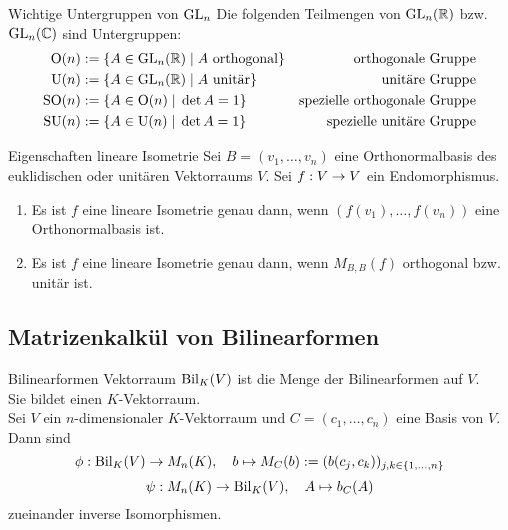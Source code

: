 \documentclass[main.tex]{subfiles}
\begin{document}
\begin{karte}{Wichtige Untergruppen von \(\operatorname{GL}_n\)}
    Die folgenden Teilmengen von \(\operatorname{GL}_n(\mathbb{R})\) bzw. \(\operatorname{GL}_n(\mathbb{C})\) sind Untergruppen:
    \begin{align*}
        \mathrm{O}(n) &:= \{A \in \operatorname{GL}_n(\mathbb{R}) \;\vert\; A \text{ orthogonal}\} &\text{orthogonale Gruppe}\\
        \mathrm{U}(n) &:= \{A \in \operatorname{GL}_n(\mathbb{R}) \;\vert\; A \text{ unitär}\} &\text{unitäre Gruppe}\\
        \mathrm{SO}(n) &:= \{A \in \mathrm{O}(n) \;\vert\; \det A = 1\} &\text{spezielle orthogonale Gruppe}\\
        \mathrm{SU}(n) &:= \{A \in \mathrm{U}(n) \;\vert\; \det A = 1\} &\text{spezielle unitäre Gruppe}
    \end{align*}
\end{karte}

\begin{karte}{Eigenschaften lineare Isometrie}
    Sei \(B = (v_1, \ldots, v_n)\) eine Orthonormalbasis des euklidischen oder unitären 
    Vektorraums \(V\). Sei \(f : V \rightarrow V\) ein Endomorphismus.
    \begin{enumerate}
        \item Es ist \(f\) eine lineare Isometrie genau dann, wenn \((f(v_1), \ldots, f(v_n))\)
        eine Orthonormalbasis ist.
        \item Es ist \(f\) eine lineare Isometrie genau dann, wenn \(M_{B,B}(f)\) orthogonal 
        bzw. unitär ist.
    \end{enumerate}
\end{karte}

\subsection*{Matrizenkalkül von Bilinearformen}

\begin{karte}{Bilinearformen Vektorraum}
    \( \operatorname{Bil}_K(V) \) ist die Menge der 
    Bilinearformen auf \( V \). \\
    Sie bildet einen \( K \)-Vektorraum.\\
    Sei \( V \) ein \(n\)-dimensionaler \(K\)-Vektorraum 
    und \( C=(c_1, \ldots, c_n) \) eine Basis von \(V\).
    Dann sind  
    \[ \phi : \operatorname{Bil}_K(V) \rightarrow M_n(K),\quad b\mapsto M_C(b) := (b(c_j, c_k))_{j,k\in\{1,\ldots,n\}} \]
    \[ \psi : M_n(K) \rightarrow \operatorname{Bil}_K(V),\quad A \mapsto b_C(A) \]
    zueinander inverse Isomorphismen.
\end{karte}
\end{document}
